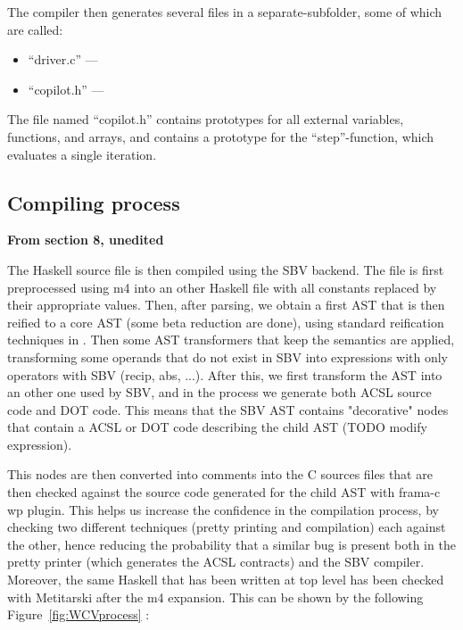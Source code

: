 The compiler then generates several files in a separate-subfolder, some of which are called:

\begin{itemize}
\item ``driver.c'' ---
\item ``copilot.h'' ---
\end{itemize}

The file named ``copilot.h'' contains prototypes for all external variables,
functions, and arrays, and contains a prototype for the ``step''-function,
which evaluates a single iteration.

\subsection{Compiling process}

\textbf{From section 8, unedited}

The Haskell source file is then compiled using the SBV backend. The file is first preprocessed using m4 into an other Haskell file with all constants replaced by their appropriate values. Then, after parsing, we obtain a first AST that is then reified to a core AST (some beta reduction are done), using standard reification techniques in \cite{Copilot06}. Then some AST transformers that keep the semantics are applied, transforming some operands that do not exist in SBV into expressions with only operators with SBV (recip, abs, ...). After this, we first transform the AST into an other one used by SBV, and in the process we generate both ACSL source code and DOT code. This means that the SBV AST contains "decorative" nodes that contain a ACSL or DOT code describing the child AST (TODO modify expression). 

This nodes are then converted into comments into the C sources files that are then checked against the source code generated for the child AST with frama-c wp plugin. This helps us increase the confidence in the compilation process, by checking two different techniques (pretty printing and compilation) each against the other, hence reducing the probability that a similar bug is present both in the pretty printer (which generates the ACSL contracts) and the SBV compiler. Moreover, the same Haskell that has been written at top level has been checked with Metitarski after the m4 expansion. This can be shown by the following Figure~\ref{fig:WCVprocess} :


